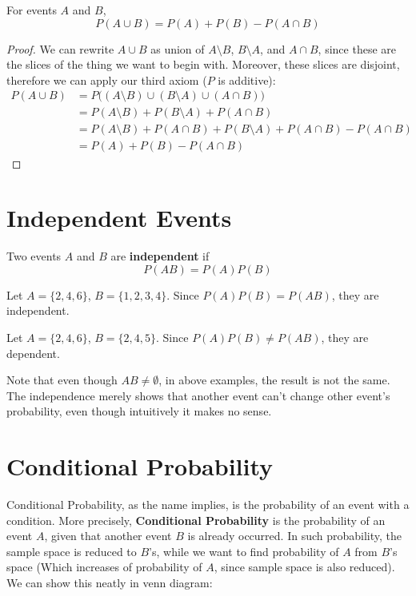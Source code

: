 \begin{lemma} For  events $A$ and $B$,
    \[ P \left(A \cup B\right)= P(A)+P(B)-P(A \cap B) \]

    \begin{proof}
        We can rewrite $A \cup B$ as union of $A \setminus B$, $B \setminus A$, and $A \cap B$, since these are the slices of the thing we want
        to begin with. Moreover, these slices are disjoint, therefore we can apply our third axiom ($P$ is additive):
        $$
        \begin{aligned}
            P \left(A \cup B\right) &= P \bigl( (A \setminus B) \cup (B \setminus A) \cup (A \cap B) \bigr) \\
            &= P(A \setminus B) + P( B \setminus A) + P(A \cap B)  \\
            &= P(A \setminus B) + P( A \cap B)+ P( B \setminus A) + P(A \cap B) - P(A \cap B)  \\
            &= P(A)+P(B)-P(A \cap B)
        \end{aligned}
        $$
    \end{proof}
\end{lemma}

\section{Independent Events}
\begin{definition}
    Two events $A$ and $B$ are \textbf{independent}  if
    \[ P(AB) = P(A)P(B) \]
\end{definition}
\par

\begin{example}
    Let $A = \{ 2,4,6 \}$, $B = \{ 1,2,3,4 \}$. Since $P(A)P(B) = P(AB)$, they are independent.
\end{example}
\begin{example}
    Let $A = \{2,4,6 \}$, $B = \{2,4,5 \}$. Since $P(A)P(B) \neq P(AB)$, they are dependent. \\
\end{example}
Note that even though $AB  \neq \emptyset$, in above examples, the result is not the same. The independence merely shows that another
event can't change other event's probability, even though intuitively it makes no sense.

\section{Conditional Probability}
Conditional Probability, as the name implies, is the probability of an event with a condition. More precisely, \textbf{Conditional
Probability}  is the probability of an event $A$, given that another event $B$ is already occurred. In such probability, the sample space
is reduced to $B$'s, while we want to find probability of $A$ from $B$'s space (Which increases of probability of $A$, since sample space
is also reduced). We can show this neatly in venn diagram:

